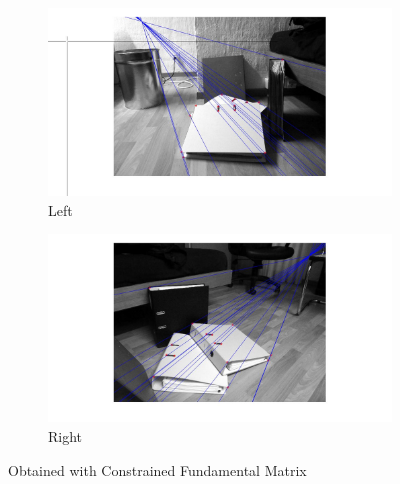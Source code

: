 \documentclass[paper=a4, fontsize=11pt]{scrartcl} %
\numberwithin{equation}{section} %
\numberwithin{figure}{section} %
\numberwithin{table}{section} %
\begin{document}
\begin{figure}
\centering
\begin{subfigure}{.5\textwidth}
  \centering
  \includegraphics[width=1.5\linewidth]{fh1.jpg}
  \caption{Left}
\end{subfigure}%
\begin{subfigure}{.7\textwidth}
  \centering
  \includegraphics[width=1.1\linewidth]{fh2.jpg}
  \caption{Right}
\end{subfigure}
\caption{Obtained with Constrained Fundamental Matrix}
\label{fig:fh}
\end{figure}
\end{document}
